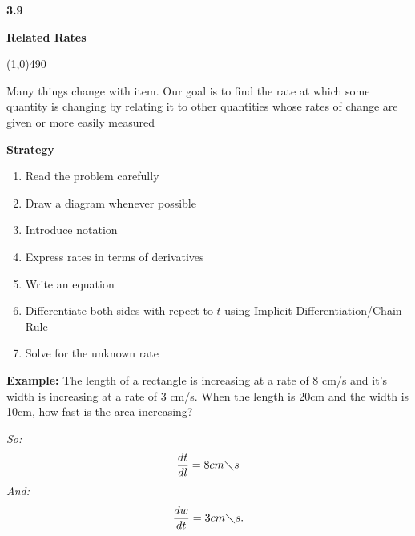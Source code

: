\documentclass{report}
\begin{document}
    \pagebreak \bigbreak \noindent
    \begin{Large}
        \begin{mdframed}
            \begin{center}
                \textbf{3.9}
            \end{center}
        \end{mdframed}
    \end{Large}
    \begin{Large}
        \begin{center}
            \textbf{Related Rates}
        \end{center}
    \end{Large}
    \line(1,0){490}
    
    \bigbreak \noindent 
    Many things change with item. Our goal is to find the rate at which some 
    quantity is changing by relating it to other quantities whose rates of 
    change are given or more easily measured 

    \bigbreak \noindent 
    \textbf{Strategy}
    \begin{enumerate}
      \item Read the problem carefully
      \item Draw a diagram whenever possible
      \item Introduce notation
      \item Express rates in terms of derivatives
      \item Write an equation 
      \item Differentiate both sides with repect to $t$ using Implicit Differentiation/Chain Rule
      \item Solve for the unknown rate
    \end{enumerate}

    \bigbreak \noindent 
    \begin{mdframed}
      \textbf{Example:}
      The length of a rectangle is increasing at a rate of 8 cm/s and it's
      width is increasing at a rate of 3 cm/s. When the length is 20cm and the
      width is 10cm, how fast is the area increasing?
    \end{mdframed}
    \bigbreak \noindent
    \textit{So:}
    \begin{align*}
      \frac{dt}{dl} = 8cm \diagdown s
    \end{align*}
    \bigbreak \noindent 
    \textit{And:}
    \begin{align*}
      \frac{dw}{dt} = 3cm \diagdown s
    .\end{align*}
\end{document}
